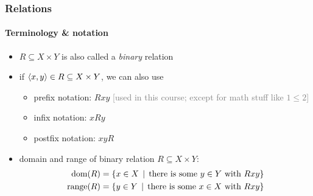 \documentclass[fleqn,10pt,serif,xcolor=svgnames,xcolor=table,aspectratio=169,handout]{beamer}
\newcommand{\mygray}[1]{\textcolor{gray}{#1}}
\begin{document}
\begin{frame}
  \frametitle{Relations}
  \framesubtitle{Terminology \& notation}

  \begin{itemize}
    \item $R \subseteq X \times Y$ is also called a \textit{binary} relation
    \item if $\left \langle x,y\right\rangle \in R \subseteq X \times Y$, we can also use
    \begin{itemize}
      \item \textcolor{themecolor}{prefix notation:} $Rxy$ \hfill \mygray{[used in this course; except for math stuff like $1\le2$]}
      \item \textcolor{themecolor}{infix notation:} $xRy$
      \item \textcolor{themecolor}{postfix notation:} $xyR$
    \end{itemize}
    \item domain and range of binary relation $R \subseteq X \times Y$:
          \begin{align*}
            \text{dom}(R) & = \left\{x \in X \thinspace \mid \thinspace \text{there is some $y \in Y$ with } Rxy\right\} \\
            \text{range}(R) & = \left\{y \in Y \thinspace \mid \thinspace \text{there is some $x \in X$ with } Rxy\right\}
          \end{align*}
  \end{itemize}

\end{frame}
\end{document}
